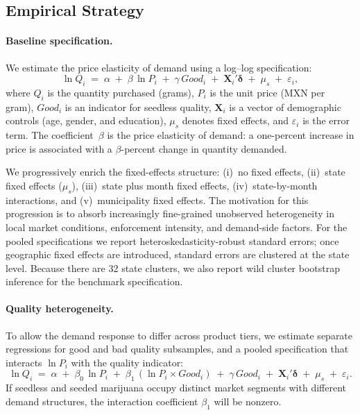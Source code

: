 \subsection{Empirical Strategy}

\paragraph{Baseline specification.}
We estimate the price elasticity of demand using a log--log specification:
\begin{equation}\label{eq:loglog}
  \ln Q_i \;=\; \alpha \;+\; \beta \, \ln P_i \;+\; \gamma \, \textit{Good}_i \;+\; \mathbf{X}_i' \boldsymbol{\delta} \;+\; \mu_s \;+\; \varepsilon_i,
\end{equation}
where $Q_i$ is the quantity purchased (grams), $P_i$ is the unit price (MXN per gram), $\textit{Good}_i$ is an indicator for seedless quality, $\mathbf{X}_i$ is a vector of demographic controls (age, gender, and education), $\mu_s$ denotes fixed effects, and $\varepsilon_i$ is the error term.  The coefficient~$\beta$ is the price elasticity of demand: a one-percent increase in price is associated with a $\beta$-percent change in quantity demanded.

We progressively enrich the fixed-effects structure: (i)~no fixed effects, (ii)~state fixed effects ($\mu_s$), (iii)~state plus month fixed effects, (iv)~state-by-month interactions, and (v)~municipality fixed effects.  The motivation for this progression is to absorb increasingly fine-grained unobserved heterogeneity in local market conditions, enforcement intensity, and demand-side factors.  For the pooled specifications we report heteroskedasticity-robust standard errors; once geographic fixed effects are introduced, standard errors are clustered at the state level.  Because there are 32 state clusters, we also report wild cluster bootstrap inference for the benchmark specification.

\paragraph{Quality heterogeneity.}
To allow the demand response to differ across product tiers, we estimate separate regressions for good and bad quality subsamples, and a pooled specification that interacts $\ln P_i$ with the quality indicator:
\begin{equation}\label{eq:interaction}
  \ln Q_i \;=\; \alpha \;+\; \beta_0 \, \ln P_i \;+\; \beta_1 \, (\ln P_i \times \textit{Good}_i) \;+\; \gamma \, \textit{Good}_i \;+\; \mathbf{X}_i' \boldsymbol{\delta} \;+\; \mu_s \;+\; \varepsilon_i.
\end{equation}
If seedless and seeded marijuana occupy distinct market segments with different demand structures, the interaction coefficient $\beta_1$ will be nonzero.

